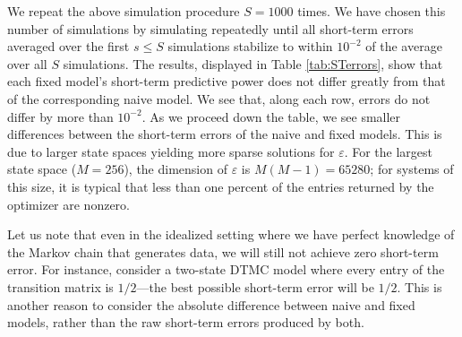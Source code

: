 \documentclass[review,letterpaper,11pt]{elsarticle}
\begin{document}
We repeat the above simulation procedure $S = 1000$ times.  We have chosen this number of simulations by simulating repeatedly until all short-term errors averaged over the first $s \leq S$ simulations stabilize to within $10^{-2}$ of the average over all $S$ simulations.  The results, displayed in Table \ref{tab:STerrors}, show that each fixed model's short-term predictive power does not differ greatly from that of the corresponding naive model.  We see that, along each row, errors do not differ by more than $10^{-2}$.  As we proceed down the table, we see smaller differences between the short-term errors of the naive and fixed models.  This is due to larger state spaces yielding more sparse solutions for $\varepsilon$.  For the largest state space ($M = 256$), the dimension of $\varepsilon$ is $M(M-1) = 65280$; for systems of this size, it is typical that less than one percent of the entries returned by the optimizer are nonzero.

Let us note that even in the idealized setting where we have perfect knowledge of the Markov chain that generates data, we will still not achieve zero short-term error.  For instance, consider a two-state DTMC model where every entry of the transition matrix is $1/2$---the best possible short-term error will be $1/2$.  This is another reason to consider the absolute difference between naive and fixed models, rather than the raw short-term errors produced by both.
\end{document}
